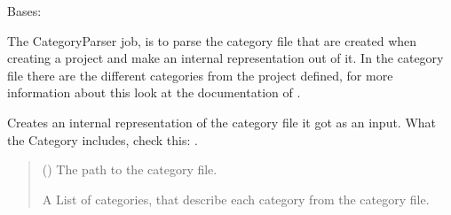 \documentclass[letterpaper,10pt,english]{sphinxmanual}
\begin{document}
\begin{fulllineitems}
\label{\detokenize{apidoc/src.osm_configurator.model.parser:src.osm_configurator.model.parser.category_parser_interface.CategoryParserInterface}}
\pysigstartsignatures
{}
\pysigstopsignatures
\sphinxAtStartPar
Bases: 

\sphinxAtStartPar
The CategoryParser job, is to parse the category file that are created when creating a project and
make an internal representation out of it.
In the category file there are the different categories from the project defined, for more information about this
look at the documentation of .

\begin{fulllineitems}
\label{\detokenize{apidoc/src.osm_configurator.model.parser:src.osm_configurator.model.parser.category_parser_interface.CategoryParserInterface.parse_category_file}}
\pysigstartsignatures
{}
\pysigstopsignatures
\sphinxAtStartPar
Creates an internal representation of the category file it got as an input.
What the Category includes, check this: .
\begin{quote}\begin{description}
\sphinxAtStartPar
{} () \textendash{} The path to the category file.

\sphinxAtStartPar
A List of categories, that describe each category from the category file.

\sphinxAtStartPar
{}

\end{description}\end{quote}

\end{fulllineitems}


\end{fulllineitems}
\end{document}
